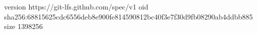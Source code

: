 version https://git-lfs.github.com/spec/v1
oid sha256:68815625cdc6556deb8e900fe814590812bc40f3e7f30d9fb08290ab4ddbb885
size 1398256
